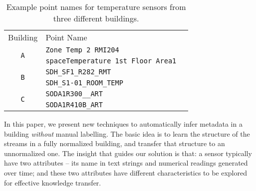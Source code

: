\begin{table}[h]
\centering
\begin{tabular}{c|ll}
\cline{1-2}
Building & Point Name & \\
\cline{1-2}
\multirow{2}{*}{\texttt{A}}  & \texttt{Zone Temp 2 RMI204} &  \\
					& \texttt{spaceTemperature 1st Floor Area1} &  \\ \cline{1-2}
\multirow{2}{*}{\texttt{B}} & \texttt{SDH\_SF1\_R282\_RMT} &  \\
                     & \texttt{SDH\_S1-01\_ROOM\_TEMP} &  \\ \cline{1-2}
\multirow{2}{*}{\texttt{C}}  & \texttt{SODA1R300\_\_ART} &  \\
					  & \texttt{SODA1R410B\_ART} &  \\ \cline{1-2}
\end{tabular}
\caption{Example point names for temperature sensors from three different buildings.}
\label{table:ex}
\end{table}

In this paper, we present new techniques to automatically infer metadata in a building {\it without} manual labelling. 
The basic idea is to learn the structure of the streams in a fully normalized building, and transfer that structure to an unnormalized one. 
The insight that guides our solution is that: a sensor typically have two attributes -- its name in text strings and numerical readings generated over time; and these two attributes have different characteristics to be explored for effective knowledge transfer. 

